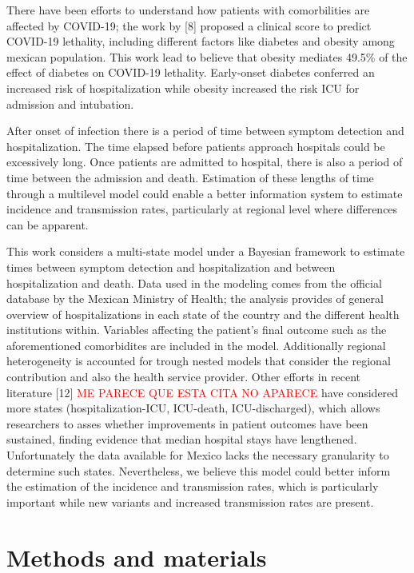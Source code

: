 \documentclass[10pt,letterpaper]{article}
\begin{document}
There have been  efforts to understand how patients with
comorbilities are affected by  COVID-19; the work by {[}8{]} proposed a clinical score to
predict COVID-19 lethality, including different factors like
diabetes and obesity among mexican population. This work lead to believe that
obesity mediates 49.5\% of the effect of diabetes on COVID-19 lethality.
Early-onset diabetes conferred an increased risk of hospitalization while
obesity increased the risk ICU for admission
and intubation.

After onset of infection there is a period of time between symptom
detection and hospitalization. The time elapsed before patients approach
hospitals could be excessively long. Once patients are admitted to
hospital, there is also a period of time between the admission and
death. Estimation of these lengths of time through a multilevel model
could enable a better information system to estimate incidence and
transmission rates, particularly at regional level where differences
can be apparent. 

This work considers a multi-state model under a Bayesian framework to
estimate times between symptom detection and hospitalization and between
hospitalization and death. Data used in the modeling comes from the
official database by the Mexican Ministry of Health; the analysis
provides of general overview of hospitalizations in each state of the
country and the different health institutions within. Variables
affecting the patient's final outcome such as the aforementioned
comorbidites are included in the model. Additionally regional
heterogeneity is accounted for trough nested models that consider the
regional contribution and also the health service provider. Other
efforts in recent literature {[}12{]} \textcolor{red}{ME PARECE QUE ESTA CITA NO APARECE} have considered more states
(hospitalization-ICU, ICU-death, ICU-discharged), which allows researchers to asses whether improvements in patient outcomes have been sustained, finding evidence that median hospital stays have lengthened.
Unfortunately the data available for Mexico lacks the necessary granularity to determine such states. Nevertheless, we believe this model
could better inform the estimation of the  incidence and
transmission rates, which is  particularly important while new variants and
increased transmission rates are present.



\hypertarget{methods-and-materials}{%
\section{Methods and materials}\label{methods-and-materials}}
\end{document}
